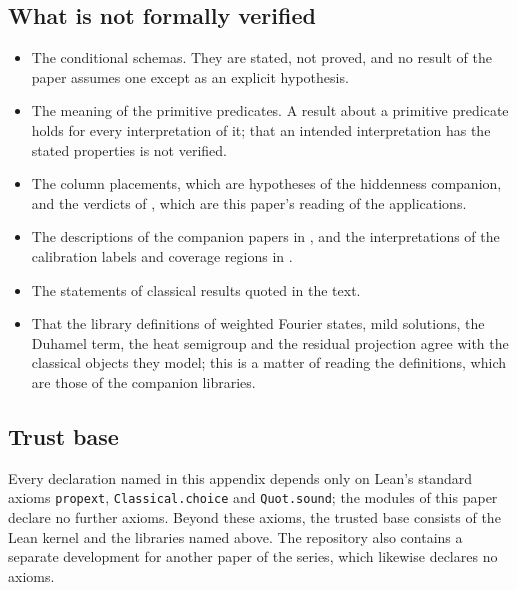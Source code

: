 \subsection{What is not formally verified}\label{app:formalization:not-verified}

\begin{itemize}
\item The conditional schemas.  They are stated, not proved, and no
  result of the paper assumes one except as an explicit hypothesis.
\item The meaning of the primitive predicates.  A result about a
  primitive predicate holds for every interpretation of it; that an
  intended interpretation has the stated properties is not verified.
\item The column placements, which are hypotheses of the hiddenness
  companion, and the verdicts of , which are
  this paper's reading of the applications.
\item The descriptions of the companion papers in
  , and the interpretations of the
  calibration labels and coverage regions in .
\item The statements of classical results quoted in the text.
\item That the library definitions of weighted Fourier states, mild
  solutions, the Duhamel term, the heat semigroup and the residual
  projection agree with the classical objects they model; this is a
  matter of reading the definitions, which are those of the companion
  libraries.
\end{itemize}

\subsection{Trust base}\label{app:formalization:trust}

Every declaration named in this appendix depends only on Lean's
standard axioms \texttt{propext}, \texttt{Classical.choice} and
\texttt{Quot.sound}; the modules of this paper declare no further
axioms.  Beyond these axioms, the trusted base consists of the Lean
kernel and the libraries named above.  The repository also contains a
separate development for another paper of the series, which likewise
declares no axioms.
